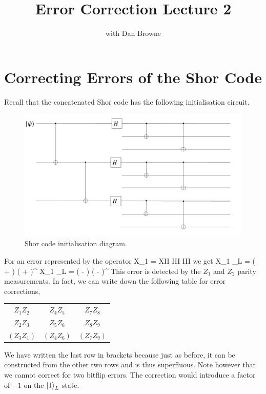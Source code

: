 


\title{Error Correction Lecture 2 }
\author{with Dan Browne}
\maketitle
\tableofcontents

\section{Correcting Errors of the Shor Code}
Recall that the concatenated Shor code has the following initialisation circuit. 

\begin{figure}[!ht]
  \caption{Shor code initialisation diagram.}
  \centering
    \includegraphics[width=\textwidth]{Shor_Code_Initialisation.jpg}
\end{figure}

For an error represented by the operator
\beq
X_1 = XII III III
\eeq
we get
\beq
X_1 _L = \left(  +  \right) \left(  +  \right)^{}
\eeq
\beq
X_1 _L = \left(  -  \right) \left(  -  \right)^{}
\eeq
This error is detected by the $Z_1$ and $Z_2$ parity measurements. In fact, we can write down the following table for error corrections, 
\begin{tabular}{ccc}
$Z_1Z_2$ & $Z_4Z_5$ & $Z_7Z_8$ \\
$Z_2 Z_3$ & $Z_5 Z_6 $ & $Z_8 Z_9$ \\
$(Z_3Z_1)$ & $(Z_4Z_6)$ & $(Z_7 Z_9)$
\end{tabular}
We have written the last row in brackets because just as before, it can be constructed from the other two rows and is thus superfluous. Note however that we cannot correct for two bitflip errors. The correction would introduce a factor of $-1$ on the $\ket{1}_L$ state. 

